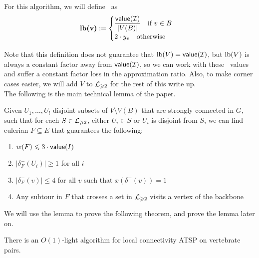 \documentclass[./main.tex]{subfiles}
\begin{document}
		\begin{definition}
			For this algorithm, we will define \lb\ as
			\[
				\textbf{\textup{lb}(v)}:=
				\begin{cases}
					\dfrac{\textsf{\textup{value}}(\mathcal{I})}{|V(B)|}\quad \text{if }v\in B \\
					2\cdot y_v\quad \text{otherwise}
				\end{cases}
			\]
		\end{definition}

		Note that this definition does not guarantee that $\textup{lb}(V) = \textsf{\textup{value}}(\mathcal{I})$, but $\textup{lb}(V)$ is always a constant factor away from $\textsf{\textup{value}}(\mathcal{I})$, so we can work with these \lb\ values and suffer a constant factor loss in the approximation ratio. Also, to make corner cases easier, we will add $V$ to $\mathcal{L}_{\geqslant 2}$ for the rest of this write up.\vspace{2mm}\\
		The following is the main technical lemma of the paper. \vspace{1mm}
		\begin{lemma}\label{lemma7}
			Given $U_1,\ldots,U_l$ disjoint subsets of $V\setminus V(B)$ that are strongly connected in $G$, such that for each $S\in \mathcal{L}_{\geqslant 2}$, either $U_i\in S$ or $U_i$ is disjoint from $S$, we can find eulerian $F\subseteq E$ that guarantees the following:
			\begin{enumerate}[(1)]
				\item $w(F)\leqslant 3\cdot \textsf{\textup{value}}(I)$\label{lemm:main:1}
				
				\item $|\delta^-_F(U_i)|\geqslant 1$ for all $i$\label{lemm:main:2}
				
				\item $|\delta^-_F(v)|\leqslant 4$ for all $v$ such that $x(\delta^-(v)) = 1$\label{lemm:main:3}
				
				\item Any subtour in $F$ that crosses a set in $\mathcal{L}_{\geqslant 2}$ visits a vertex of the backbone\label{lemm:main:4}
			\end{enumerate}
		\end{lemma}
		We will use the lemma to prove the following theorem, and prove the lemma later on.\\
		\begin{theorem}
			There is an $O(1)$-light algorithm for local connectivity ATSP on vertebrate pairs.
		\end{theorem}
\end{document}
